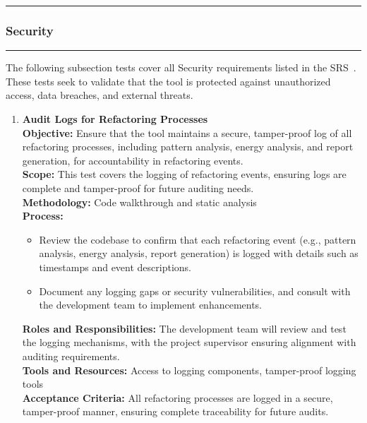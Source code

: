 \documentclass[12pt, titlepage]{article}
\newcommand{\colorrule}{\textcolor{BlueViolet}{\rule{\linewidth}{2pt}}}
\begin{document}
\newpage

\noindent
\colorrule

\subsubsection{Security}
\colorrule

\medskip

\noindent
The following subsection tests cover all Security requirements listed in the SRS~\cite{SRS}. These tests seek to validate that the tool is protected against unauthorized access, data breaches, and external threats.

\begin{enumerate}[label={\bf \textcolor{Maroon}{test-SRT-\arabic*}}, wide=0pt, font=\itshape]  
  \item \textbf{Audit Logs for Refactoring Processes} \\[2mm]
    \textbf{Objective:} Ensure that the tool maintains a secure, tamper-proof log of all refactoring processes, including pattern analysis, energy analysis, and report generation, for accountability in refactoring events. \\[2mm]
    \textbf{Scope:} This test covers the logging of refactoring events, ensuring logs are complete and tamper-proof for future auditing needs. \\[2mm]
    \textbf{Methodology:} Code walkthrough and static analysis \\[2mm]
    \textbf{Process:}
    \begin{itemize}
      \item Review the codebase to confirm that each refactoring event (e.g., pattern analysis, energy analysis, report generation) is logged with details such as timestamps and event descriptions.
      \item Document any logging gaps or security vulnerabilities, and consult with the development team to implement enhancements.
    \end{itemize}
    \textbf{Roles and Responsibilities:} The development team will review and test the logging mechanisms, with the project supervisor ensuring alignment with auditing requirements. \\[2mm]
    \textbf{Tools and Resources:} Access to logging components, tamper-proof logging tools \\[2mm]
    \textbf{Acceptance Criteria:} All refactoring processes are logged in a secure, tamper-proof manner, ensuring complete traceability for future audits.


\end{enumerate}
\end{document}
